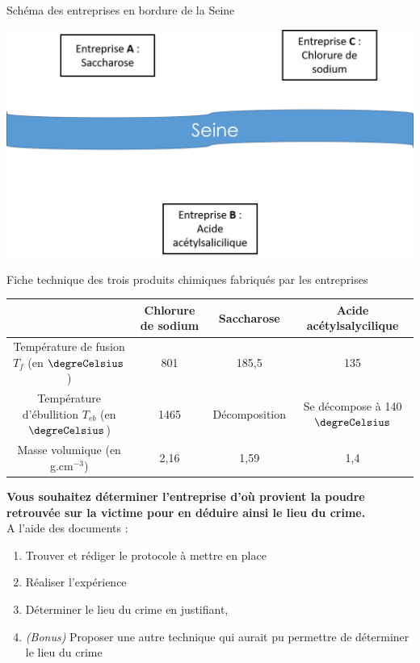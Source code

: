 \begin{doc}{Schéma des entreprises en bordure de la Seine}
\begin{center}
    \includegraphics[scale=0.5]{Images/TP2/Entreprise.png}
\end{center}
\end{doc}
\newpage
\begin{doc}{Fiche technique des trois produits chimiques fabriqués par les entreprises}
\newline
    \begin{tabular}{|C{0.4}|C{0.1}|C{0.2}|C{0.2}|}
    \hline
     & Chlorure de sodium & Saccharose & Acide acétylsalycilique \\
    \hline
    Température de fusion $T_{f}$ \newline (en $\degreCelsius$) & 801 & 185,5 & 135 \\
    \hline
    Température d'ébullition $T_{eb}$ \newline (en $\degreCelsius$) & 1465 & Décomposition & Se décompose à 140 $\degreCelsius$ \\
    \hline
    Masse volumique (en g.cm$^{-3}$) & 2,16 & 1,59 & 1,4 \\
    \hline
    \end{tabular}
\end{doc}

\textbf{Vous souhaitez déterminer l’entreprise d’où provient la poudre retrouvée sur la victime pour en déduire ainsi le lieu du crime.}\\
A l’aide des documents :
\begin{enumerate}
    \item Trouver et rédiger le protocole à mettre en place
    \item Réaliser l’expérience
    \item Déterminer le lieu du crime en justifiant,
    \item \textit{(Bonus)} Proposer une autre technique qui aurait pu permettre de déterminer le lieu du crime
\end{enumerate}

